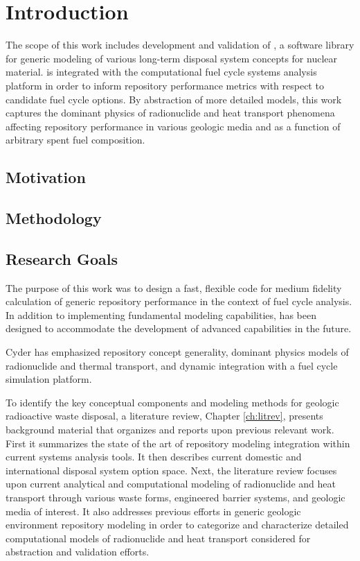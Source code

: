 \chapter{Introduction}\label{ch:introduction}


The scope of this work includes development and validation of \Cyder, a software 
library for generic modeling of various long-term disposal system concepts for 
nuclear material. \Cyder is integrated with the \Cyclus computational fuel cycle 
systems analysis platform in order to inform repository performance metrics with 
respect to candidate fuel cycle options.  By abstraction of more detailed 
models, this work captures the dominant physics of radionuclide and heat 
transport phenomena affecting repository performance in various geologic media 
and as a function of arbitrary spent fuel composition. 

\section{Motivation} 


\section{Methodology} 


\section{Research Goals}

The purpose of this work was to design a fast, flexible code for medium fidelity 
calculation of generic repository performance in the context of fuel cycle 
analysis. In addition to implementing fundamental modeling capabilities, \Cyder 
has been designed to accommodate the development of advanced capabilities in the 
future.

Cyder has emphasized repository concept generality, dominant physics models of 
radionuclide and thermal transport, and dynamic integration with a fuel cycle 
simulation platform.


To identify the key conceptual components and modeling methods for geologic 
radioactive waste disposal, a literature review, Chapter \ref{ch:litrev}, 
presents background material that organizes and reports upon previous relevant 
work. First it summarizes the state of the art of repository modeling 
integration within current systems analysis tools. It then describes current 
domestic and international disposal system option space.  Next, the literature 
review focuses upon current analytical and computational modeling of 
radionuclide and heat transport through various waste forms, engineered barrier 
systems, and geologic media of interest.  It also addresses previous efforts in 
generic geologic environment repository modeling in order to categorize and 
characterize detailed computational models of radionuclide and heat transport 
considered for abstraction and validation efforts.

